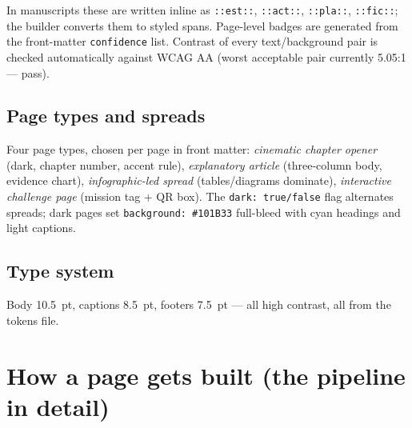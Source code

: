 \documentclass[11pt,a4paper]{article}
\newcommand{\code}[1]{\texttt{#1}}
\begin{document}
In manuscripts these are written inline as \code{::est::}, \code{::act::},
\code{::pla::}, \code{::fic::}; the builder converts them to styled spans.
Page-level badges are generated from the front-matter \code{confidence} list.
Contrast of every text/background pair is checked automatically against WCAG
AA (worst acceptable pair currently 5.05:1 --- pass).

\subsection{Page types and spreads}
Four page types, chosen per page in front matter:
\emph{cinematic chapter opener} (dark, chapter number, accent rule),
\emph{explanatory article} (three-column body, evidence chart),
\emph{infographic-led spread} (tables/diagrams dominate),
\emph{interactive challenge page} (mission tag + QR box). The
\code{dark: true/false} flag alternates spreads; dark pages set
\code{background: \#101B33} full-bleed with cyan headings and light captions.

\subsection{Type system}
Body 10.5~pt, captions 8.5~pt, footers 7.5~pt --- all high contrast, all from
the tokens file.

\section{How a page gets built (the pipeline in detail)}
\end{document}

